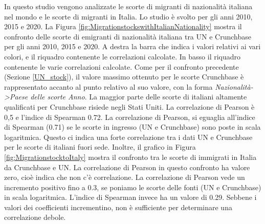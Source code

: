 In questo studio vengono analizzate le scorte di migranti di nazionalità italiana nel mondo e le scorte di migranti in Italia. Lo studio è svolto per gli anni 2010, 2015 e 2020. 
La Figura \ref{fig:MigrationstockswithItalianNationality} mostra il confronto delle scorte di emigranti di nazionalità italiana tra UN e Crunchbase per gli anni 2010, 2015 e 2020. A destra la barra che indica i valori relativi ai vari colori, e il riquadro contenente le correlazioni calcolate. In basso il riquadro contenente le varie correlazioni calcolate. Come per il confronto precedente (Sezione \ref{UN_stock}), il valore massimo ottenuto per le scorte Crunchbase è rappresentato accanto al punto relativo al suo valore, con la forma \textit{Nazionalità->Paese delle scorte Anno}. La maggior parte delle scorte di italiani altamente qualificati per Crunchbase risiede negli Stati Uniti.
La correlazione di Pearson è 0,5 e l'indice di Spearman 0.72. La correlazione di Pearson, si eguaglia all'indice di Spearman (0.71) se le scorte in ingresso (UN e Crunchbase) sono poste in scala logaritmica. Questo ci indica una forte correlazione tra i dati UN e Crunchbase per le scorte di italiani fuori sede. 
Inoltre, il grafico in Figura \ref{fig:MigrationstocktoItaly} mostra il confronto tra le scorte di immigrati in Italia da Crunchbase e UN. La correlazione di Pearson in questo confronto ha valore zero, cioè indica che non c'è correlazione.
La correlazione di Pearson vede un incremento positivo fino a 0.3, se poniamo le scorte delle fonti (UN e Crunchbase) in scala logaritmica. L'indice di Spearman invece ha un valore di 0.29. Sebbene i valori dei coefficienti incrementino, non è sufficiente per determinare una correlazione debole.


\FloatBarrier
